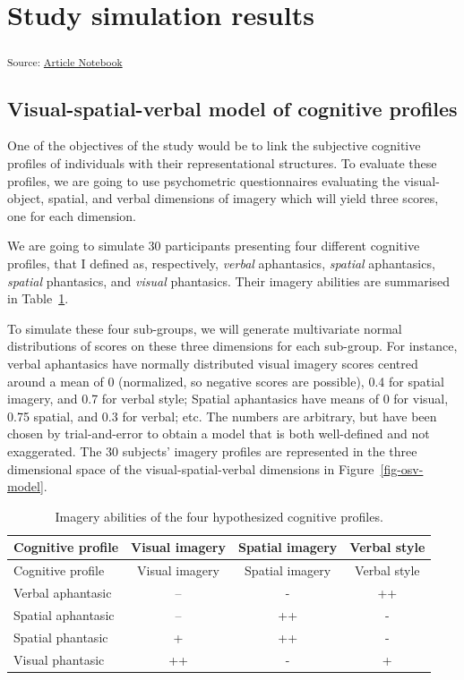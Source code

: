 \documentclass[
  authoryear]{elsarticle}
\begin{document}
\section{Study simulation results}\label{study-simulation-results}

\textsubscript{Source:
\href{https://m-delem.github.io/2499-similarity-manuscript/index.qmd.html}{Article
Notebook}}

\subsection{Visual-spatial-verbal model of cognitive
profiles}\label{sec-osv-model-theory}

One of the objectives of the study would be to link the subjective
cognitive profiles of individuals with their representational
structures. To evaluate these profiles, we are going to use psychometric
questionnaires evaluating the visual-object, spatial, and verbal
dimensions of imagery which will yield three scores, one for each
dimension.

We are going to simulate 30 participants presenting four different
cognitive profiles, that I defined as, respectively, \emph{verbal}
aphantasics, \emph{spatial} aphantasics, \emph{spatial} phantasics, and
\emph{visual} phantasics. Their imagery abilities are summarised in
Table~\ref{tbl-imageries}.

To simulate these four sub-groups, we will generate multivariate normal
distributions of scores on these three dimensions for each sub-group.
For instance, verbal aphantasics have normally distributed visual
imagery scores centred around a mean of 0 (normalized, so negative
scores are possible), 0.4 for spatial imagery, and 0.7 for verbal style;
Spatial aphantasics have means of 0 for visual, 0.75 spatial, and 0.3
for verbal; etc. The numbers are arbitrary, but have been chosen by
trial-and-error to obtain a model that is both well-defined and not
exaggerated. The 30 subjects' imagery profiles are represented in the
three dimensional space of the visual-spatial-verbal dimensions in
Figure~\ref{fig-osv-model}.

\begin{longtable}[]{@{}lccc@{}}
\caption{Imagery abilities of the four hypothesized cognitive
profiles.}\label{tbl-imageries}\tabularnewline
\toprule\noalign{}
Cognitive profile & Visual imagery & Spatial imagery & Verbal style \\
\midrule\noalign{}
\endfirsthead
\toprule\noalign{}
Cognitive profile & Visual imagery & Spatial imagery & Verbal style \\
\midrule\noalign{}
\endhead
\bottomrule\noalign{}
\endlastfoot
Verbal aphantasic & -- & - & ++ \\
Spatial aphantasic & -- & ++ & - \\
Spatial phantasic & + & ++ & - \\
Visual phantasic & ++ & - & + \\
\end{longtable}
\end{document}
